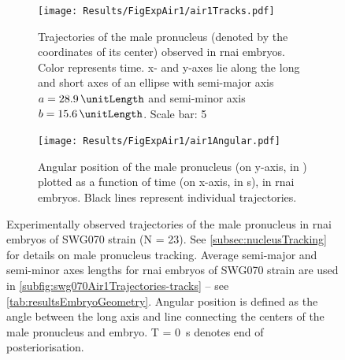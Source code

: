 \begin{figure}
\centering
\begin{subfigure}[t]{0.4\textwidth}
    \centering
    \texttt{[image: Results/FigExpAir1/air1Tracks.pdf]}
    \caption{Trajectories of the male pronucleus (denoted by the coordinates of its center) observed in  \ac{rnai} embryos. Color represents time. x- and y-axes lie along the long and short axes of an ellipse with semi-major axis $a = \SI{28.9}{\unitLength}$ and semi-minor axis $b = \SI{15.6}{\unitLength}$. Scale bar: \SI{5}{\unitLength}} 
    \label{subfig:swg070Air1Trajectories-tracks}
\end{subfigure}
\hfill
\begin{subfigure}[t]{0.57\textwidth}
    \centering
    \texttt{[image: Results/FigExpAir1/air1Angular.pdf]}
    \caption{Angular position of the male pronucleus (on y-axis, in \si{\unitAngle}) plotted as a function of time (on x-axis, in \si{\second}), in  \ac{rnai} embryos. Black lines represent individual trajectories.} 
    \label{subfig:swg070Air1Trajectories-angleVsTime}
\end{subfigure}
\caption[Experimentally observed trajectories of the male pronucleus in  \acs{rnai} embryos]{Experimentally observed trajectories of the male pronucleus in  \ac{rnai} embryos of SWG070 strain (N = 23). See \autoref{subsec:nucleusTracking} for details on male pronucleus tracking. Average semi-major and semi-minor axes lengths for  \ac{rnai} embryos of SWG070 strain are used in \autoref{subfig:swg070Air1Trajectories-tracks} -- see \autoref{tab:resultsEmbryoGeometry}. Angular position is defined as the angle between the long axis and line connecting the centers of the male pronucleus and embryo. T = \SI{0}{\second} denotes end of posteriorisation.}
\label{fig:swg070Air1Trajectories}
\end{figure}

